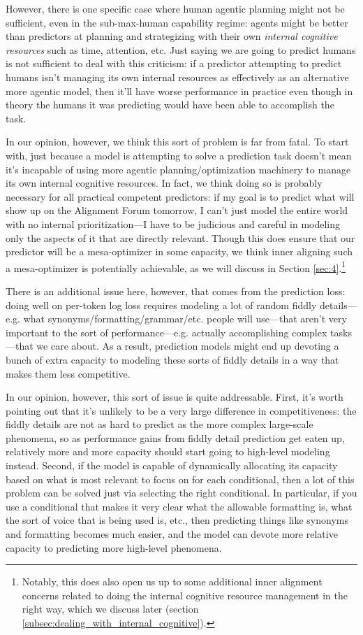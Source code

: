 \documentclass[
  onecolumn,
  natbib,
]{miri-tech-article}
\begin{document}
However, there is one specific case where human agentic planning might not be sufficient, even in the sub-max-human capability regime: agents might be better than predictors at planning and strategizing with their own \textit{internal cognitive resources} such as time, attention, etc. Just saying we are going to predict humans is not sufficient to deal with this criticism: if a predictor attempting to predict humans isn't managing its own internal resources as effectively as an alternative more agentic model, then it'll have worse performance in practice even though in theory the humans it was predicting would have been able to accomplish the task.

In our opinion, however, we think this sort of problem is far from fatal. To start with, just because a model is attempting to solve a prediction task doesn't mean it's incapable of using more agentic planning/optimization machinery to manage its own internal cognitive resources. In fact, we think doing so is probably necessary for all practical competent predictors: if my goal is to predict what will show up on the Alignment Forum tomorrow, I can't just model the entire world with no internal prioritization---I have to be judicious and careful in modeling only the aspects of it that are directly relevant. Though this does ensure that our predictor will be a mesa-optimizer\cite{risks} in some capacity, we think inner aligning such a mesa-optimizer is potentially achievable, as we will discuss in Section \ref{sec:4}.\footnote{Notably, this does also open us up to some additional inner alignment concerns related to doing the internal cognitive resource management in the right way, which we discuss later (section \ref{subsec:dealing_with_internal_cognitive}).}

There is an additional issue here, however, that comes from the prediction loss: doing well on per-token log loss requires modeling a lot of random fiddly details---e.g. what synonyms/formatting/grammar/etc. people will use---that aren't very important to the sort of performance---e.g. actually accomplishing complex tasks---that we care about. As a result, prediction models might end up devoting a bunch of extra capacity to modeling these sorts of fiddly details in a way that makes them less competitive.

In our opinion, however, this sort of issue is quite addressable. First, it's worth pointing out that it's unlikely to be a very large difference in competitiveness: the fiddly details are not as hard to predict as the more complex large-scale phenomena, so as performance gains from fiddly detail prediction get eaten up, relatively more and more capacity should start going to high-level modeling instead. Second, if the model is capable of dynamically allocating its capacity based on what is most relevant to focus on for each conditional, then a lot of this problem can be solved just via selecting the right conditional. In particular, if you use a conditional that makes it very clear what the allowable formatting is, what the sort of voice that is being used is, etc., then predicting things like synonyms and formatting becomes much easier, and the model can devote more relative capacity to predicting more high-level phenomena.
\end{document}

